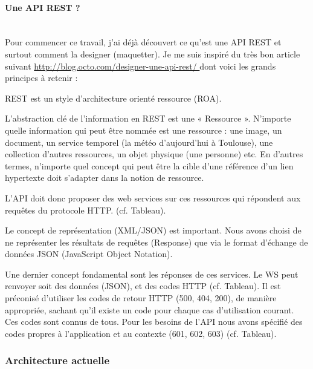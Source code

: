 \paragraph{Une API REST ?}\\

Pour commencer ce travail, j'ai déjà découvert ce qu'est une API REST et surtout comment la designer (maquetter). Je me suis inspiré du très bon article suivant \url{http://blog.octo.com/designer-une-api-rest/ } dont voici les grands principes à retenir :

\item REST est un style d'architecture orienté ressource (ROA).
\item L'abstraction clé de l'information en REST est une « Ressource ». N'importe quelle information qui peut être nommée est une ressource : une image, un document, un service temporel (la météo d'aujourd'hui à Toulouse), une collection d'autres ressources, un objet physique (une personne) etc. En d'autres termes, n'importe quel concept qui peut être la cible d'une référence d'un lien hypertexte doit s'adapter dans la notion de ressource.
\item L'API doit donc proposer des web services sur ces ressources qui répondent aux requêtes du protocole HTTP. (cf. Tableau).
\item Le concept de représentation (XML/JSON) est important. Nous avons choisi de ne représenter les résultats de requêtes (Response) que via le format d'échange de données JSON (JavaScript Object Notation).
\item Une dernier concept fondamental sont les réponses de ces services. Le WS peut renvoyer soit des données (JSON), et des codes HTTP (cf. Tableau). Il est préconisé d'utiliser les codes de retour HTTP (500, 404, 200), de manière appropriée, sachant qu'il existe un code pour chaque cas d'utilisation courant. Ces codes sont connus de tous. Pour les besoins de l'API nous avons spécifié des codes propres à l'application et au contexte (601, 602, 603) (cf. Tableau).


\subsubsection{Architecture actuelle}

